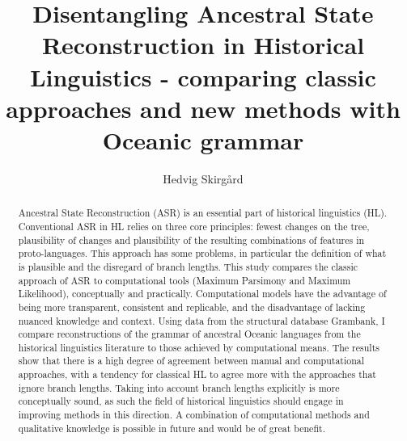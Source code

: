 \documentclass[12pt,letterpaper]{article}
\title{Disentangling Ancestral State Reconstruction in Historical Linguistics - comparing classic approaches and new methods with Oceanic grammar}
\author[1]{Hedvig Skirgård}
\affil[1]{Department of Linguistic and Cultural Evolution, Max Planck Institute for Evolutionary Anthropology. Leipzig, Germany.}
\begin{document}

\thispagestyle{empty}


\maketitle
\thispagestyle{empty}





\begin{abstract}

Ancestral State Reconstruction (ASR) is an essential part of historical linguistics (HL). Conventional ASR in HL relies on three core principles: fewest changes on the tree,  plausibility of changes and plausibility of the resulting combinations of features in proto-languages. This approach has some problems, in particular the definition of what is plausible and the disregard of branch lengths. This study compares the classic approach of ASR to computational tools (Maximum Parsimony and Maximum Likelihood), conceptually and practically. Computational models have the advantage of being more transparent, consistent and replicable, and the disadvantage of lacking nuanced knowledge and context. Using data from the structural database Grambank, I compare reconstructions of the grammar of ancestral Oceanic languages from the historical linguistics literature to those achieved by computational means. The results show that there is a high degree of agreement between manual and computational approaches, with a tendency for classical HL to agree more with the approaches that ignore branch lengths. Taking into account branch lengths explicitly is more conceptually sound, as such the field of historical linguistics should engage in improving methods in this direction. A combination of computational methods and qualitative knowledge is possible in future and would be of great benefit.


\end{abstract}
\end{document}
